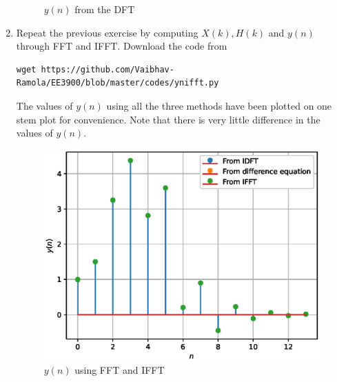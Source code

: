 \documentclass[journal,12pt,twocolumn]{IEEEtran}
\renewcommand\thesection{\arabic{section}}
\begin{document}
\begin{enumerate}[label=\thesection.\arabic*]
\begin{figure}[!ht]
	\caption{$y(n)$ from the DFT}
	\label{fig:yndft}
\end{figure}
\item Repeat the previous exercise by computing $X(k), H(k)$ and $y(n)$ through FFT and 
IFFT.
\solution Download the code from
\begin{lstlisting}
wget https://github.com/Vaibhav-Ramola/EE3900/blob/master/codes/ynifft.py
\end{lstlisting}
The values of $y(n)$ using all the three methods have been plotted on one stem plot for convenience. Note that there is very little difference in the values of $y(n)$.
\begin{figure}
	\centering
	\includegraphics[width=\columnwidth]{figs/ynifft}
	\caption{$y(n)$ using FFT and IFFT}
	\label{fig:y-n-fft}
\end{figure}
\newpage 
\end{enumerate}
\end{document}
